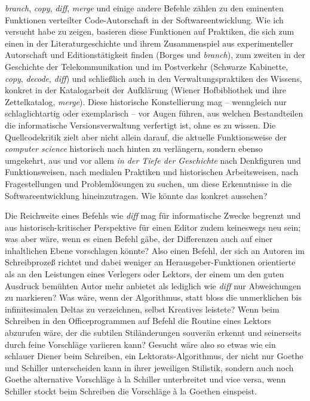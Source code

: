\documentclass[a4paper,12pt]{article}
\begin{document}
\emph{branch}, \emph{copy}, \emph{diff}, \emph{merge} und einige andere Befehle zählen zu den eminenten Funktionen verteilter Code-Autorschaft in der Softwareentwicklung. Wie ich versucht habe zu zeigen, basieren diese Funktionen auf Praktiken, die sich zum einen in der Literaturgeschichte und ihrem Zusammenspiel aus experimenteller Autorschaft und Editionstätigkeit finden (Borges und \emph{branch}), zum zweiten in der Geschichte der Telekommunikation und im Postverkehr (Schwarze Kabinette, \emph{copy}, \emph{decode}, \emph{diff}) und schließlich auch in den Verwaltungspraktiken des Wissens, konkret in der Katalogarbeit der Aufklärung (Wiener Hofbibliothek und ihre Zettelkatalog, \emph{merge}). Diese historische Konstellierung mag – wenngleich nur schlaglichtartig oder exemplarisch – vor Augen führen, aus welchen Bestandteilen die informatische Versionsverwaltung verfertigt ist, ohne es zu wissen. Die Quellcodekritik zielt aber nicht allein darauf, die aktuelle Funktionsweise der \emph{computer science} historisch nach hinten zu verlängern, sondern ebenso umgekehrt, aus und vor allem \emph{in der Tiefe der Geschichte} nach Denkfiguren und Funktionsweisen, nach medialen Praktiken und historischen Arbeitsweisen, nach Fragestellungen und Problemlösungen zu suchen, um diese Erkenntnisse in die Softwareentwicklung hineinzutragen. Wie könnte das konkret aussehen? 

Die Reichweite eines Befehls wie \emph{diff} mag für informatische Zwecke begrenzt und aus historisch-kritischer Perspektive für einen Editor zudem keineswegs neu sein; was aber wäre, wenn es einen Befehl gäbe, der Differenzen auch auf einer inhaltlichen Ebene vorschlagen könnte? Also einen Befehl, der sich an Autoren im Schreibprozeß richtet und dabei weniger an Herausgeber-Funktionen orientierte als an den Leistungen eines Verlegers oder Lektors, der einem um den guten Ausdruck bemühten Autor mehr anbietet als lediglich wie \emph{diff} nur Abweichungen zu markieren? Was wäre, wenn der Algorithmus, statt bloss die unmerklichen bis infinitesimalen Deltas zu verzeichnen, selbst Kreatives leistete? Wenn beim Schreiben in den Officeprogrammen auf Befehl die Routine eines Lektors abzurufen wäre, der die subtilen Stiländerungen souverän erkennt und seinerseits durch feine Vorschläge variieren kann? Gesucht wäre also so etwas wie ein schlauer Diener beim Schreiben, ein Lektorats-Algorithmus, der nicht nur Goethe und Schiller unterscheiden kann in ihrer jeweiligen Stilistik, sondern auch noch Goethe alternative Vorschläge à la Schiller unterbreitet und vice versa, wenn Schiller stockt beim Schreiben die Vorschläge à la Goethen einspeist.
\end{document}
